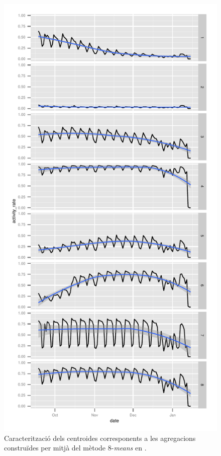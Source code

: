 \documentclass[
	a4paper,
	twoside,
	justified
]{tufte-book}
\begin{document}
\begin{figure}
\begin{center}
\includegraphics{presence_8_clust}
\caption{
	\label{graph:presence_8_clust}
	Caracterització dels centroides corresponents a les agregacions construïdes per mitjà del mètode 8-\emph{means} en .  
}
\end{center}
\end{figure}
\end{document}
